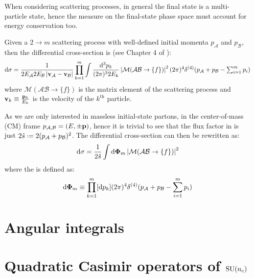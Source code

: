 When considering scattering processes, in general the final state is a multi-particle state, hence the measure on the final-state phase space must account for energy conservation too.

Given a $ 2 \rightarrow m $ scattering process with well-defined initial momenta $ p_\mathcal{A} $ and $ p_\mathcal{B} $, then the differential cross-section is (see Chapter 4 of \cite{Peskin-1995}):
\begin{equation}
  \mathrm{d}\sigma = \frac{1}{2E_\mathcal{A} 2E_\mathcal{B} \left\lvert\mathbf{v}_\mathcal{A} - \mathbf{v}_\mathcal{B}\right\rvert} \prod_{k = 1}^m \int \frac{\mathrm{d}^3p_k}{(2\pi)^3 2E_k} \left\lvert\mathcal{M}(\mathcal{A} \mathcal{B} \rightarrow \{f\})\right\rvert^2 (2\pi)^4 \delta^{(4)}(p_\mathcal{A} + p_\mathcal{B} - \textstyle\sum_{i = 1}^m p_i)
  \label{eq:scatt-cr-sec}
\end{equation}
where $ \mathcal{M}(\mathcal{A} \mathcal{B} \rightarrow \{f\}) $ is the matrix element of the scattering process and $ \mathbf{v}_k \equiv \frac{\mathbf{p}_k}{E_k} $ is the velocity of the $ k^\text{th} $ particle.

As we are only interested in massless initial-state partons, in the center-of-mass (CM) frame $ p_{\mathcal{A},\mathcal{B}} = (E, \pm\mathbf{p}) $, hence it is trivial to see that the flux factor in  is just $ 2\hat{s} \defeq 2 (p_\mathcal{A} + p_\mathcal{B})^2 $. The differential cross-section can then be rewritten as:
\begin{equation}
  \mathrm{d} \sigma = \frac{1}{2\hat{s}} \int \mathrm{d} \boldsymbol{\Phi}_m \left\lvert\mathcal{M}(\mathcal{A}\mathcal{B} \rightarrow \{f\})\right\rvert^2
\end{equation}
where the  is defined as:
\begin{equation}
  \mathrm{d} \boldsymbol{\Phi}_m \equiv \prod_{k = 1}^m [\mathrm{d} p_k] (2\pi)^4 \delta^{(4)}(p_\mathcal{A} + p_\mathcal{B} - \sum_{i = 1}^m p_i)
\end{equation}

\section{Angular integrals}

\section{Quadratic Casimir operators of \texorpdfstring{$ \mathrm{SU}(n_c) $}{SU(n)}}
\label{sec:cas-op}

